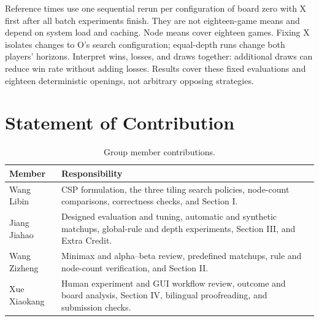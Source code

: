 \documentclass[UTF8,fontset=fandol,11pt,a4paper]{ctexart}
\begin{document}
\begin{table}[htbp]
  \centering\small
  \caption{Global-line depth controls; eighteen games per row. Nodes sum both players.}
  
\end{table}



\begin{table}[htbp]
  \centering\small
  \caption{All extended-game openings; columns give $(d_X,d_O)$, D means draw.}
  
\end{table}

Reference times use one sequential rerun per configuration of board zero
with X first after all batch experiments finish. They are not eighteen-game
means and depend on system load and caching. Node means cover eighteen
games. Fixing X isolates changes to O's search
configuration; equal-depth runs change both players' horizons. Interpret
wins, losses, and draws together: additional draws can reduce win rate
without adding losses. Results cover these fixed evaluations and eighteen
deterministic openings, not arbitrary opposing strategies.

\clearpage
\section{Statement of Contribution}

\begin{table}[htbp]
  \centering\small
  \caption{Group member contributions.}
  \renewcommand{\arraystretch}{1.25}
  \begin{tabular}{lp{110mm}}
    \toprule
    Member & Responsibility\\
    \midrule
    Wang Libin & CSP formulation, the three tiling search policies, node-count comparisons, correctness checks, and Section I.\\
    Jiang Jiahao & Designed evaluation and tuning, automatic and synthetic matchups, global-rule and depth experiments, Section III, and Extra Credit.\\
    Wang Zizheng & Minimax and alpha--beta review, predefined matchups, rule and node-count verification, and Section II.\\
    Xue Xiaokang & Human experiment and GUI workflow review, outcome and board analysis, Section IV, bilingual proofreading, and submission checks.\\
    \bottomrule
  \end{tabular}
\end{table}
\end{document}

